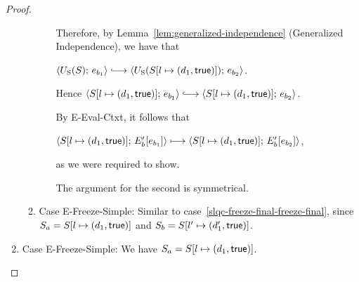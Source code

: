 \begin{proof}
\begin{enumerate}
\begin{enumerate}
\begin{itemize}
        Therefore, by Lemma~\ref{lem:generalized-independence}
        (Generalized Independence), we have that

        $\config{\Ustore(S)}{e_{b_1}} \parstepsto
        \config{\Ustore(\extS{S}{l}{d_1}{\frozentrue})}{e_{b_2}}$.

        Hence $\config{\extS{S}{l}{d_1}{\frozentrue}}{e_{b_1}}
        \parstepsto
        \config{\extS{S}{l}{d_1}{\frozentrue}}{e_{b_2}}$.

        By {\sc E-Eval-Ctxt}, it follows that

        $\langle S[l \mapsto (d_1, \textsf{true})];\, E'_b\hspace{-0.5mm}\left[e_{b_1}\right] \rangle
        \longmapsto
        \langle S[l \mapsto (d_1, \textsf{true})];\, E'_b\hspace{-0.5mm}\left[e_{b_2}\right] \rangle$,

        as we were required to show.

        The argument for the second is symmetrical.

      \end{itemize}

    \item \label{slqc-freeze-final-freeze-simple}Case {\sc
      E-Freeze-Simple}: Similar to
      case~\ref{slqc-freeze-final-freeze-final}, since $S_a =
      S[l \mapsto (d_1, \textsf{true})]$ and $S_b =
      S[l' \mapsto (d'_1, \textsf{true})]$.
    \end{enumerate}

  \item Case {\sc E-Freeze-Simple}: We have $S_a =
    S[l \mapsto (d_1, \textsf{true})]$.


\end{enumerate}
\end{proof}
